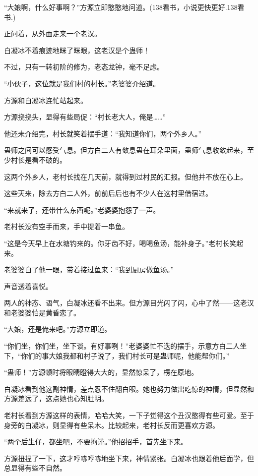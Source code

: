 
\begin{this_body}

“大娘啊，什么好事啊？”方源立即憨憨地问道。(138看书，小说更快更好.138看书.)

正问着，从外面走来一个老汉。

白凝冰不着痕迹地眯了眯眼，这老汉是个蛊师！

不过，只有一转初阶的修为，老态龙钟，毫不足虑。

“小伙子，这位就是我们村的村长。”老婆婆介绍道。

方源和白凝冰连忙站起来。

方源挠挠头，显得有些局促：“村长老大人，俺是……”

他还未介绍完，村长就笑着摆手道：“我知道你们，两个外乡人。”

蛊师之间可以感受气息。但方白二人有敛息蛊在耳朵里面，蛊师气息收敛起来，至少村长是看不破的。

这两个外乡人，老村长找在几天前，就得到过村民的汇报。但他并不放在心上。

这些天来，除去方白二人外，前前后后也有不少人在这村里借宿过。

“来就来了，还带什么东西呢。”老婆婆抱怨了一声。

老村长没有空手而来，手中提着一串鱼。

“这是今天早上在水塘钓来的。你牙齿不好，喝喝鱼汤，能补身子。”老村长笑起来。

老婆婆白了他一眼，带着接过鱼来：“我到厨房做鱼汤。”

声音透着喜悦。

两人的神态、语气，白凝冰还看不出来。但方源目光闪了闪，心中了然——这老汉和老婆婆怕是黄昏恋了。

“大娘，还是俺来吧。”方源立即道。

“你们坐，你们坐，坐下谈。有好事咧！”老婆婆忙不迭的摆手，示意方白二人坐下，“你们的事大娘我都和村子说了，我们村长可是蛊师呢，他能帮你们。”

“蛊师！”方源顿时将眼睛瞪得大大的，显然惊呆了，楞在原地。

白凝冰看到他这副神情，差点忍不住翻白眼。她也努力做出吃惊的神情，但显然和方源差远了，这点她也心知肚明。

老村长看到方源这样的表情，哈哈大笑，一下子觉得这个丑汉憨得有些可爱。至于身旁的白凝冰，则显得有些呆木。比较起来，老村长反而更喜欢方源。

“两个后生仔，都坐吧，不要拘谨。”他招招手，首先坐下来。

方源扭捏了一下，这才哼哧哼哧地坐下来，神情紧张。白凝冰也跟着他后面学，但总显得有些不自然。


\end{this_body}
